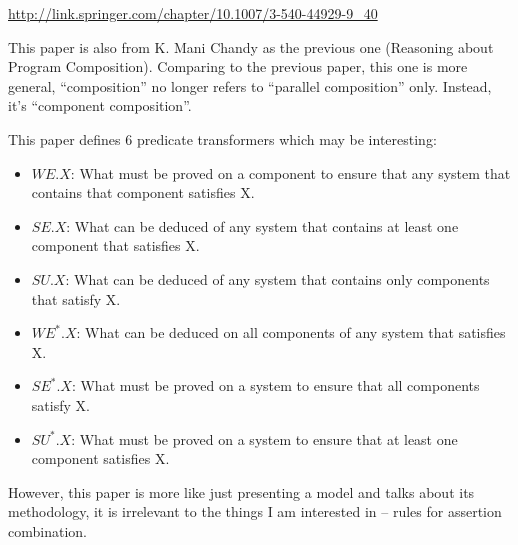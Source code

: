 \documentclass[12pt, fleqn]{article}
\begin{document}
\url{http://link.springer.com/chapter/10.1007/3-540-44929-9_40}

\bigskip

This paper is also from K. Mani Chandy as the previous one (Reasoning
about Program Composition). Comparing to the previous paper, this one
is more general, ``composition'' no longer refers to ``parallel
composition'' only. Instead, it's ``component composition''.

This paper defines 6 predicate transformers which may be interesting:

\begin{itemize}
\item $WE.X$: What must be proved on a component to ensure that any
  system that contains that component satisfies X.
\item $SE.X$: What can be deduced of any system that contains at least
  one component that satisfies X.
\item $SU.X$: What can be deduced of any system that contains only
  components that satisfy X.
\item $WE^*.X$: What can be deduced on all components of any system
  that satisfies X.
\item $SE^*.X$: What must be proved on a system to ensure that all
  components satisfy X.
\item $SU^*.X$: What must be proved on a system to ensure that at
  least one component satisfies X.
\end{itemize}

However, this paper is more like just presenting a model and talks
about its methodology, it is irrelevant to the things I am interested
in -- rules for assertion combination.


\end{document}
